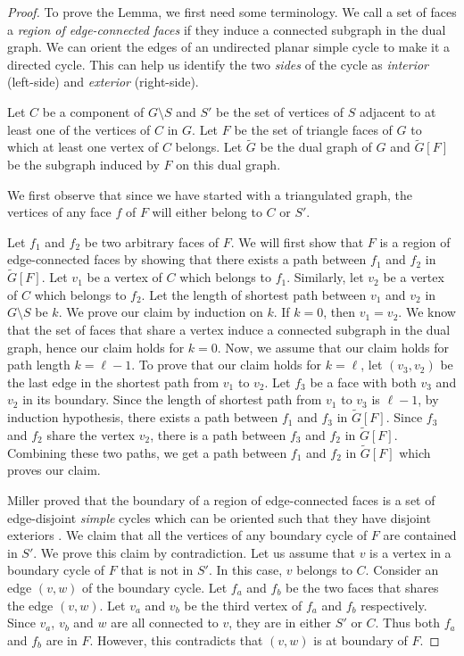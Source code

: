 \documentclass{toc}
\begin{document}
\begin{proof}
To prove the Lemma, we first need some terminology. We call a set of faces a \emph{region of edge-connected faces} if they induce a connected subgraph in the dual graph. We can orient the edges of an undirected planar simple cycle to make it a directed cycle. This can help us identify the two \emph{sides} of the cycle as \emph{interior} (left-side) and \emph{exterior} (right-side).

Let $C$ be a component of $G \setminus S$ and $S'$ be the set of vertices of $S$ adjacent to at least one of the vertices of $C$ in $G$. Let $F$ be the set of triangle faces of $G$ to which at least one vertex of $C$ belongs. Let $\tilde{G}$ be the dual graph of $G$ and $\tilde{G}[F]$ be the subgraph induced by $F$ on this dual graph.  %
%
%
%
%
%
%

%
We first observe that since we have started with a triangulated graph, the vertices of any face $f$ of $F$ will either belong to $C$ or $S'$. 

Let $f_1$ and $f_2$ be two arbitrary faces of $F$. We will first show that $F$ is a region of edge-connected faces by showing that there exists a path between $f_1$ and $f_2$ in $\tilde{G}[F]$. Let $v_1$ be a vertex of $C$ which belongs to $f_1$. Similarly, let $v_2$ be a vertex of $C$ which belongs to $f_2$. Let the length of shortest path between $v_1$ and $v_2$ in $G \setminus S$ be $k$. We prove our claim by induction on $k$. If $k = 0$, then $v_1 = v_2$. We know that the set of faces that share a vertex induce a connected subgraph in the dual graph, hence our claim holds for $k=0$.
Now, we assume that our claim holds for path length $k = \ell-1$. To prove that our claim holds for $k= \ell$, let $(v_3, v_2)$ be the last edge in the shortest path from $v_1$ to $v_2$. Let $f_3$ be a face with both $v_3$ and $v_2$ in its boundary. Since the length of shortest path from $v_1$ to $v_3$ is $\ell-1$, by induction hypothesis, there exists a path between $f_1$ and $f_3$ in $\tilde{G}[F]$. Since $f_3$ and $f_2$ share the vertex $v_2$, there is a path between $f_3$ and $f_2$ in $\tilde{G}[F]$. Combining these two paths, we get a path between $f_1$ and $f_2$ in $\tilde{G}[F]$ which proves our claim.

Miller proved that the boundary of a region of edge-connected faces is a set of edge-disjoint \emph{simple} cycles which can be oriented such that they have disjoint exteriors \cite{Miller}. We claim that all the vertices of any boundary cycle of $F$ are contained in $S'$. We prove this claim by contradiction. Let us assume that $v$ is a vertex in a boundary cycle of $F$ that is not %
 in $S'$. In this case, $v$ belongs to $C$. Consider an edge $(v,w)$ of the boundary cycle. Let $f_a$ and $f_b$ be the two faces that shares the edge $(v,w)$. Let $v_a$ and $v_b$ be the third vertex of $f_a$ and $f_b$ respectively. Since $v_a$, $v_b$ and $w$ are all connected to $v$, they are %
 in either $S'$ or $C$. Thus both $f_a$ and $f_b$ are in $F$. However, this contradicts that $(v,w)$ is at boundary of $F$. 


\end{proof}
\end{document}
